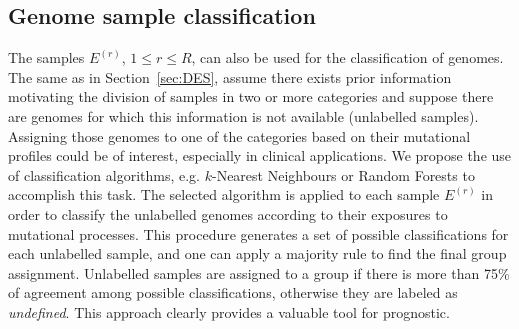\documentclass{bioinfo}
\begin{document}
\subsection{Genome sample classification}
The samples $E^{(r)}$, $1\leq r\leq R$, can also be used for the
classification of genomes. The same as in Section~\ref{sec:DES},
assume there exists prior information motivating the
division of samples in two or more categories and suppose there are
genomes for which this information is not available 
(unlabelled samples). Assigning those genomes to one of the categories 
based on their mutational profiles could be of interest, especially
in clinical applications. We propose the use of classification
algorithms, e.g. $k$-Nearest Neighbours or Random Forests to
accomplish this task. The selected algorithm is applied to each 
sample $E^{(r)}$ in order to classify the unlabelled
genomes according to their exposures to mutational processes.
This procedure generates a set of possible classifications
for each unlabelled sample, and one can apply a majority rule to find
the final group assignment.  Unlabelled samples are assigned to a
group if there is more than 75\% of agreement among possible
classifications, otherwise they are labeled as \textit{undefined}.
This approach clearly provides a valuable tool for prognostic.
\end{document}
